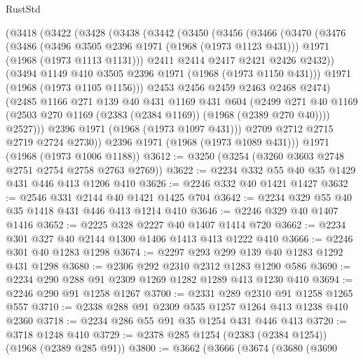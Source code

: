 \begin{lexlean}{RustStd}
\begin{coremodule}
{\begin{coremodule}
{{{{{    (@3418
      (@3422
        (@3428
          (@3438
            (@3442
              (@3450
                (@3456
                  (@3466
                    (@3470
                      (@3476
                        (@3486
                          (@3496 @3505 @2396 @1971 (@1968 (@1973 @1123 @431)))
                          @1971
                          (@1968 (@1973 @1113 @1131)))
                        @2411
                        @2414
                        @2417
                        @2421
                        @2426
                        @2432))
                    (@3494 @1149 @410 @3505 @2396 @1971 (@1968 (@1973 @1150 @431)))
                    @1971
                    (@1968 (@1973 @1105 @1156)))
                  @2453
                  @2456
                  @2459
                  @2463
                  @2468
                  @2474)
                (@2485
                  @1166
                  @271
                  @139
                  @40
                  @431
                  @1169
                  @431
                  @604
                  (@2499
                    @271
                    @40
                    @1169
                    (@2503 @270 @1169 (@2383 (@2384 @1169)) (@1968 (@2389 @270 @40))))
                  @2527)))
            @2396
            @1971
            (@1968 (@1973 @1097 @431)))
          @2709
          @2712
          @2715
          @2719
          @2724
          @2730))
      @2396
      @1971
      (@1968 (@1973 @1089 @431)))
    @1971
    (@1968 (@1973 @1006 @1188))
@3612 := @3250 (@3254 (@3260 @3603 @2748 @2751 @2754 @2758 @2763 @2769))
@3622 := @2234 @332 @55 @40 @35 @1429 @431 @446 @413 @1206 @410
@3626 := @2246 @332 @40 @1421 @1427
@3632 := @2546 @331 @2144 @40 @1421 @1425 @704
@3642 := @2234 @329 @55 @40 @35 @1418 @431 @446 @413 @1214 @410
@3646 := @2246 @329 @40 @1407 @1416
@3652 := @2225 @328 @2227 @40 @1407 @1414 @720
@3662 := @2234 @301 @327 @40 @2144 @1300 @1406 @1413 @413 @1222 @410
@3666 := @2246 @301 @40 @1283 @1298
@3674 := @2297 @293 @299 @139 @40 @1283 @1292 @431 @1298
@3680 := @2306 @292 @2310 @2312 @1283 @1290 @586
@3690 := @2234 @290 @288 @91 @2309 @1269 @1282 @1289 @413 @1230 @410
@3694 := @2246 @290 @91 @1258 @1267
@3700 := @2331 @289 @2310 @91 @1258 @1265 @557
@3710 := @2338 @288 @91 @2309 @535 @1257 @1264 @413 @1238 @410 @2360
@3718 := @2234 @286 @55 @91 @35 @1254 @431 @446 @413
@3720 := @3718 @1248 @410
@3729 := @2378 @285 @1254 (@2383 (@2384 @1254)) (@1968 (@2389 @285 @91))
@3800 := @3662
    (@3666
      (@3674
        (@3680
          (@3690
}}}}}
\end{coremodule}}
\end{coremodule}
\end{lexlean}
